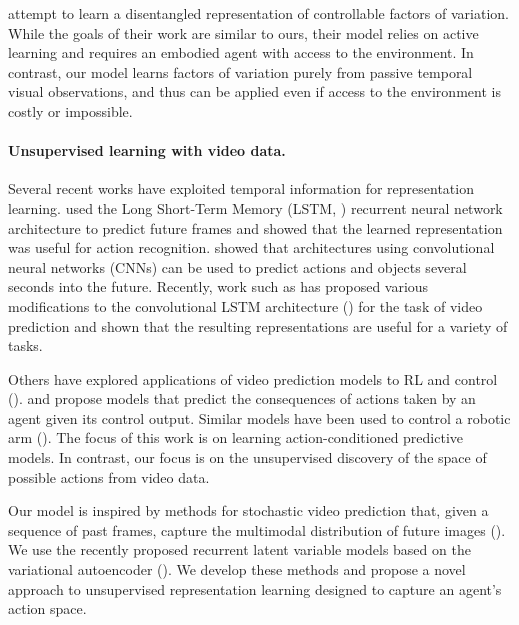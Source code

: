 \documentclass{article} %
\begin{document}
\cite{thomas2017independently} attempt to learn a disentangled representation of controllable factors of variation. While the goals of their work are similar to ours, their model relies on active learning and requires an embodied agent with access to the environment. In contrast, our model learns factors of variation purely from passive temporal visual observations, and thus can be applied even if access to the environment is costly or impossible.

\vspace{-8pt}
\paragraph{Unsupervised learning with video data.}

Several recent works have exploited temporal information for representation learning. \cite{srivastava2015unsupervised} used the Long Short-Term Memory (LSTM, \cite{hochreiter1997long}) recurrent neural network architecture to predict future frames and showed that the learned representation was useful for action recognition. \cite{vondrick2016anticipating} showed that architectures using convolutional neural networks (CNNs) can be used to predict actions and objects several seconds into the future. Recently, work such as  \cite{finn2016unsupervised,villegas2017decomposing,denton2017unsupervised} has proposed various modifications to the convolutional LSTM architecture (\cite{xingjian2015convolutional}) for the task of video prediction and shown that the resulting representations are useful for a variety of tasks.

Others have explored applications of video prediction models to RL and control (\cite{racaniere2017imagination,Ha2018WorldModels,merlin}). \cite{ChiappaRWM17} and \cite{Oh:2015:AVP:2969442.2969560} propose models that predict the consequences of actions taken by an agent given its control output. Similar models have been used to control a robotic arm (\cite{agrawal2016learning,finn2017deep,ebert2017self}). %
The focus of this work is on learning action-conditioned predictive models. In contrast, %
our focus is 
on the unsupervised discovery of the space of possible actions from video data. 
 
Our model is inspired by methods for stochastic video prediction that, given a sequence of past frames, capture the multimodal distribution of future images (\cite{goroshin2015learning, henaff2017prediction}). We use the recently proposed recurrent latent variable models based on the variational autoencoder  (\cite{babaeizadeh2018stochastic,denton18stochastic,lee2018savp}). We develop these methods and propose a novel approach to unsupervised representation learning designed to capture an agent's action space. 
\end{document}
